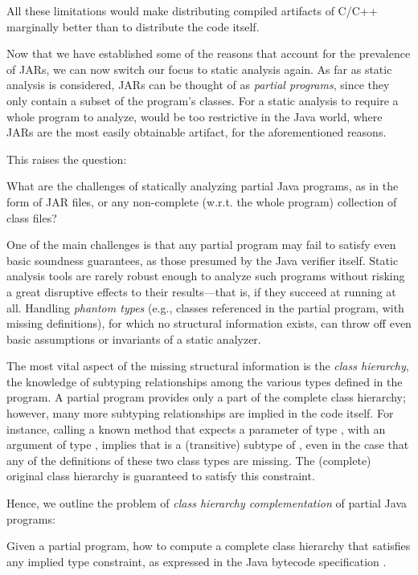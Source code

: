 All these limitations would make distributing compiled artifacts of
C/C++ marginally better than to distribute the code itself.

Now that we have established some of the reasons that account for the
prevalence of JARs, we can now switch our focus to static analysis
again. As far as static analysis is considered, JARs can be thought of
as \emph{partial programs}, since they only contain a subset of the
program's classes. For a static analysis to require a whole program to
analyze, would be too restrictive in the Java world, where JARs are
the most easily obtainable artifact, for the aforementioned reasons.

This raises the question:
\begin{displayquote}
  What are the challenges of statically analyzing partial Java
  programs, as in the form of JAR files, or any non-complete
  (w.r.t. the whole program) collection of class files?
\end{displayquote}

One of the main challenges is that any partial program may fail to
satisfy even basic soundness guarantees, as those presumed by the Java
verifier itself. Static analysis tools are rarely robust enough to
analyze such programs without risking a great disruptive effects to
their results---that is, if they succeed at running at all. Handling
\emph{phantom types} (e.g., classes referenced in the partial program,
with missing definitions), for which no structural information exists,
can throw off even basic assumptions or invariants of a static
analyzer.

The most vital aspect of the missing structural information is the
\emph{class hierarchy}, the knowledge of subtyping relationships among
the various types defined in the program. A partial program provides
only a part of the complete class hierarchy; however, many more
subtyping relationships are implied in the code itself. For instance,
calling a known method that expects a parameter of type , with
an argument of type , implies that  is a
(transitive) subtype of , even in the case that any of the
definitions of these two class types are missing. The (complete)
original class hierarchy is guaranteed to satisfy this
constraint.

Hence, we outline the problem of \emph{class hierarchy
  complementation} of partial Java programs:
\begin{displayquote}
  Given a partial program, how to compute a complete class hierarchy
  that satisfies any implied type constraint, as expressed in the Java
  bytecode specification \cite{Lindholm:1999:JVM:553607}.
\end{displayquote}

